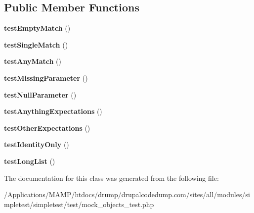 \subsection*{Public Member Functions}
\begin{DoxyCompactItemize}
\item 
\hypertarget{class_test_of_parameters_expectation_abdad37236cade76b8e86311121f4597f}{
{\bfseries testEmptyMatch} ()}
\label{class_test_of_parameters_expectation_abdad37236cade76b8e86311121f4597f}

\item 
\hypertarget{class_test_of_parameters_expectation_a655a4974cd488a81a19208b8a0ae9f86}{
{\bfseries testSingleMatch} ()}
\label{class_test_of_parameters_expectation_a655a4974cd488a81a19208b8a0ae9f86}

\item 
\hypertarget{class_test_of_parameters_expectation_ad9c48735efd87ac9ddbfef4bf165f71c}{
{\bfseries testAnyMatch} ()}
\label{class_test_of_parameters_expectation_ad9c48735efd87ac9ddbfef4bf165f71c}

\item 
\hypertarget{class_test_of_parameters_expectation_a283d03bf3368b5890489e7f0608b2eb4}{
{\bfseries testMissingParameter} ()}
\label{class_test_of_parameters_expectation_a283d03bf3368b5890489e7f0608b2eb4}

\item 
\hypertarget{class_test_of_parameters_expectation_a650ce5c60b73b515598519d926e153d7}{
{\bfseries testNullParameter} ()}
\label{class_test_of_parameters_expectation_a650ce5c60b73b515598519d926e153d7}

\item 
\hypertarget{class_test_of_parameters_expectation_a95b5241f57a1b1332bd4f0ed41ab35a7}{
{\bfseries testAnythingExpectations} ()}
\label{class_test_of_parameters_expectation_a95b5241f57a1b1332bd4f0ed41ab35a7}

\item 
\hypertarget{class_test_of_parameters_expectation_acf4917e7001e036fd77a489f786de072}{
{\bfseries testOtherExpectations} ()}
\label{class_test_of_parameters_expectation_acf4917e7001e036fd77a489f786de072}

\item 
\hypertarget{class_test_of_parameters_expectation_a32709eed9093c441cf68009a98d5bbdd}{
{\bfseries testIdentityOnly} ()}
\label{class_test_of_parameters_expectation_a32709eed9093c441cf68009a98d5bbdd}

\item 
\hypertarget{class_test_of_parameters_expectation_a20f68586b271d6d59247daa0dcd32108}{
{\bfseries testLongList} ()}
\label{class_test_of_parameters_expectation_a20f68586b271d6d59247daa0dcd32108}

\end{DoxyCompactItemize}


The documentation for this class was generated from the following file:\begin{DoxyCompactItemize}
\item 
/Applications/MAMP/htdocs/drump/drupalcodedump.com/sites/all/modules/simpletest/simpletest/test/mock\_\-objects\_\-test.php\end{DoxyCompactItemize}
